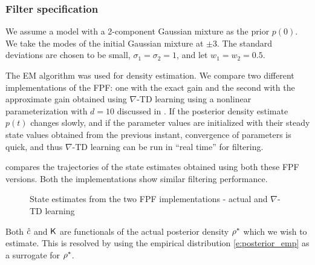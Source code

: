 \subsubsection*{Filter specification}  We assume a model with a 2-component Gaussian mixture as the prior $p(0)$. We take the modes of the initial Gaussian mixture at $\pm 3$. The standard deviations are chosen to be small, $\sigma_{1}=\sigma_{2}=1$, and let $w_{1}=w_{2}=0.5$.

The EM algorithm was used for density estimation. We compare two different implementations of the FPF: one with the exact gain and the second with the approximate gain obtained using $\nabla$-TD learning using a nonlinear parameterization with $d=10$ discussed in . If the posterior density estimate $p(t)$ changes slowly, and if the parameter values are initialized with their steady state values obtained from the previous instant, convergence of parameters is quick, and thus $\nabla$-TD learning can be run in ``real time'' for filtering.

 compares the trajectories of the state estimates obtained using both these FPF versions. Both the implementations show similar filtering performance.

\begin{figure}
	\begin{center}
		\caption{ State estimates from the two FPF implementations - actual and $\nabla$-TD learning }
		\label{Chap4_Fig_FPF_EM_TD}
	\end{center}
\end{figure}

%

Both ${\hat c}$ and $\text{\sf K}$ are functionals of the actual posterior density $\rho^*$  which we wish to estimate.  This is resolved by using the empirical distribution \eqref{e:posterior_emp} as a surrogate for $\rho^*$.



